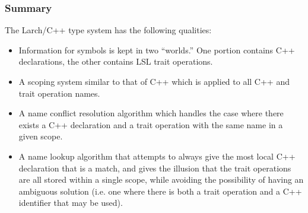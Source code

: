 \subsubsection{Summary}
The Larch/C++ type system has the following qualities:

\begin{itemize}

\item Information for symbols is kept in two ``worlds.'' One portion
contains C++ declarations, the other contains LSL trait operations.

\item A scoping system similar to that of C++ which is applied to all
C++ and trait operation names.

\item A name conflict resolution algorithm which handles the case
where there exists a C++ declaration and a trait operation with the same
name in a given scope.

\item A name lookup algorithm that attempts to always give the most
local C++ declaration that is a match, and gives the illusion that the
trait operations are all stored within a single scope, while avoiding
the possibility of having an ambiguous solution (i.e. one where there
is both a trait operation and a C++ identifier that may be used).

\end{itemize}
